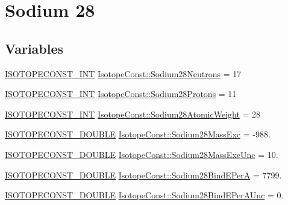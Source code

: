 \hypertarget{group___isotope_const-_sodium-_na28}{}\section{Sodium 28}
\label{group___isotope_const-_sodium-_na28}
\subsection*{Variables}
\begin{DoxyCompactItemize}
\item 
\mbox{\hyperlink{group___isotope_const-_macros_ga5f18360b3e99483a35c32d789e62621c}{I\+S\+O\+T\+O\+P\+E\+C\+O\+N\+S\+T\+\_\+\+I\+NT}} \mbox{\hyperlink{group___isotope_const-_sodium-_na28_gaf19b2a3f16531a5615f67006f0ca834c}{Isotope\+Const\+::\+Sodium28\+Neutrons}} = 17
\item 
\mbox{\hyperlink{group___isotope_const-_macros_ga5f18360b3e99483a35c32d789e62621c}{I\+S\+O\+T\+O\+P\+E\+C\+O\+N\+S\+T\+\_\+\+I\+NT}} \mbox{\hyperlink{group___isotope_const-_sodium-_na28_ga1fd3a72e781d1b421cd57457939b7015}{Isotope\+Const\+::\+Sodium28\+Protons}} = 11
\item 
\mbox{\hyperlink{group___isotope_const-_macros_ga5f18360b3e99483a35c32d789e62621c}{I\+S\+O\+T\+O\+P\+E\+C\+O\+N\+S\+T\+\_\+\+I\+NT}} \mbox{\hyperlink{group___isotope_const-_sodium-_na28_ga6bd7bc8ceaffc359e72d709599c07f45}{Isotope\+Const\+::\+Sodium28\+Atomic\+Weight}} = 28
\item 
\mbox{\hyperlink{group___isotope_const-_macros_ga8f45a7272ce02c0b4c65c44636ed719a}{I\+S\+O\+T\+O\+P\+E\+C\+O\+N\+S\+T\+\_\+\+D\+O\+U\+B\+LE}} \mbox{\hyperlink{group___isotope_const-_sodium-_na28_ga67e9ff7359da6b712f01c7f16f9537dc}{Isotope\+Const\+::\+Sodium28\+Mass\+Exc}} = -\/988.
\item 
\mbox{\hyperlink{group___isotope_const-_macros_ga8f45a7272ce02c0b4c65c44636ed719a}{I\+S\+O\+T\+O\+P\+E\+C\+O\+N\+S\+T\+\_\+\+D\+O\+U\+B\+LE}} \mbox{\hyperlink{group___isotope_const-_sodium-_na28_gaf4cf7856b11f47d57e29474a561e7241}{Isotope\+Const\+::\+Sodium28\+Mass\+Exc\+Unc}} = 10.
\item 
\mbox{\hyperlink{group___isotope_const-_macros_ga8f45a7272ce02c0b4c65c44636ed719a}{I\+S\+O\+T\+O\+P\+E\+C\+O\+N\+S\+T\+\_\+\+D\+O\+U\+B\+LE}} \mbox{\hyperlink{group___isotope_const-_sodium-_na28_gaf8c2f7eab65bbd31000e6c9b63b5fbed}{Isotope\+Const\+::\+Sodium28\+Bind\+E\+PerA}} = 7799.
\item 
\mbox{\hyperlink{group___isotope_const-_macros_ga8f45a7272ce02c0b4c65c44636ed719a}{I\+S\+O\+T\+O\+P\+E\+C\+O\+N\+S\+T\+\_\+\+D\+O\+U\+B\+LE}} \mbox{\hyperlink{group___isotope_const-_sodium-_na28_gaece3115a33124a7cbd0dae4b4ee86216}{Isotope\+Const\+::\+Sodium28\+Bind\+E\+Per\+A\+Unc}} = 0.

\end{DoxyCompactItemize}
